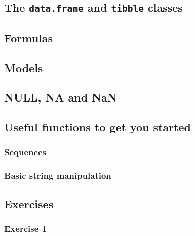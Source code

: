 \documentclass[]{gitbook}
\begin{document}
\hypertarget{the-data.frame-and-tibble-classes}{%
\subsection{\texorpdfstring{The \texttt{data.frame} and \texttt{tibble} classes}{The data.frame and tibble classes}}\label{the-data.frame-and-tibble-classes}}

\hypertarget{formulas}{%
\subsection{Formulas}\label{formulas}}

\hypertarget{models}{%
\subsection{Models}\label{models}}

\hypertarget{null-na-and-nan}{%
\subsection{NULL, NA and NaN}\label{null-na-and-nan}}

\hypertarget{useful-functions-to-get-you-started}{%
\subsection{Useful functions to get you started}\label{useful-functions-to-get-you-started}}

\hypertarget{sequences}{%
\subsubsection{Sequences}\label{sequences}}

\hypertarget{basic-string-manipulation}{%
\subsubsection{Basic string manipulation}\label{basic-string-manipulation}}

\hypertarget{exercises-1}{%
\subsection{Exercises}\label{exercises-1}}

\hypertarget{exercise-1-1}{%
\subsubsection*{Exercise 1}\label{exercise-1-1}}
\end{document}
